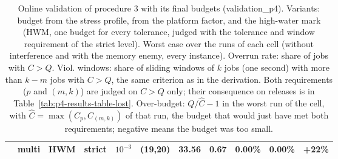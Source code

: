 \begin{table}[ht]
{\begin{tabular}{llllrrrrrrr}
 & multi & HWM & strict & $10^{-3}$ & (19,20) & 33.56 & 0.67 & 0.00\% & 0.00\% & +22\% \\
\bottomrule
\end{tabular}}
\caption{Online validation of procedure 3 with its final budgets (validation\_p4). Variants: budget from the stress profile, from the platform factor, and the high-water mark (HWM, one budget for every tolerance, judged with the tolerance and window requirement of the strict level). Worst case over the runs of each cell (without interference and with the memory enemy, every instance). Overrun rate: share of jobs with $C>Q$. Viol. windows: share of sliding windows of $k$ jobs (one second) with more than $k-m$ jobs with $C>Q$, the same criterion as in the derivation. Both requirements ($p$ and $(m,k)$) are judged on $C>Q$ only; their consequence on releases is in Table~\ref{tab:p4-results-table-lost}. Over-budget: $Q/\hat C-1$ in the worst run of the cell, with $\hat C=\max(C_p,C_{(m,k)})$ of that run, the budget that would just have met both requirements; negative means the budget was too small.}
\label{tab:p4-results-table}
\end{table}

